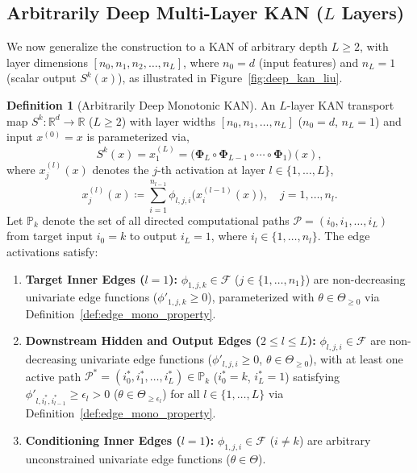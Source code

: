 \documentclass[11pt,a4paper]{article}
\theoremstyle{plain}
\theoremstyle{definition}
\newtheorem{definition}[theorem]{Definition}
\theoremstyle{remark}
\begin{document}
\subsection{Arbitrarily Deep Multi-Layer KAN (\texorpdfstring{$L$}{L} Layers)}

We now generalize the construction to a KAN of arbitrary depth $L \ge 2$, with layer dimensions $[n_0, n_1, n_2, \dots, n_L]$, where $n_0 = d$ (input features) and $n_L = 1$ (scalar output $S^k(x)$), as illustrated in Figure~\ref{fig:deep_kan_liu}.

\begin{definition}[Arbitrarily Deep Monotonic KAN]
\label{def:deep_mono_kan}
\label{def:deep_kan}
An $L$-layer KAN transport map $S^k: \mathbb{R}^d \to \mathbb{R}$ ($L \ge 2$) with layer widths $[n_0, n_1, \dots, n_L]$ ($n_0 = d$, $n_L = 1$) and input $x^{(0)} = x$ is parameterized via,
\begin{equation}
    S^k(x) = x^{(L)}_1 = \Big( \mathbf{\Phi}_L \circ \mathbf{\Phi}_{L-1} \circ \cdots \circ \mathbf{\Phi}_1 \Big)(x),
    \label{eq:kan_composition_def}
\end{equation}
where $x^{(l)}_j(x)$ denotes the $j$-th activation at layer $l \in \{1, \dots, L\}$,
\begin{equation}
    x^{(l)}_j(x) \coloneqq \sum_{i=1}^{n_{l-1}} \phi_{l, j, i}\big(x^{(l-1)}_i(x)\big), \quad j = 1, \dots, n_l.
    \label{eq:kan_layer_def}
\end{equation}
Let $\mathbb{P}_k$ denote the set of all directed computational paths $\mathcal{P} = (i_0, i_1, \dots, i_L)$ from target input $i_0 = k$ to output $i_L = 1$, where $i_l \in \{1, \dots, n_l\}$. The edge activations satisfy:
\begin{enumerate}
    \item \textbf{Target Inner Edges ($l=1$):} $\phi_{1, j, k} \in \mathcal{F}$ ($j \in \{1, \dots, n_1\}$) are non-decreasing univariate edge functions ($\phi'_{1, j, k} \ge 0$), parameterized with $\theta \in \Theta_{\ge 0}$ via Definition~\ref{def:edge_mono_property}.
    \item \textbf{Downstream Hidden and Output Edges ($2 \le l \le L$):} $\phi_{l, j, i} \in \mathcal{F}$ are non-decreasing univariate edge functions ($\phi'_{l, j, i} \ge 0$, $\theta \in \Theta_{\ge 0}$), with at least one active path $\mathcal{P}^* = (i_0^*, i_1^*, \dots, i_L^*) \in \mathbb{P}_k$ ($i_0^* = k$, $i_L^* = 1$) satisfying $\phi'_{l, i_l^*, i_{l-1}^*} \ge \epsilon_l > 0$ ($\theta \in \Theta_{\ge \epsilon_l}$) for all $l \in \{1, \dots, L\}$ via Definition~\ref{def:edge_mono_property}.
    \item \textbf{Conditioning Inner Edges ($l=1$):} $\phi_{1, j, i} \in \mathcal{F}$ ($i \neq k$) are arbitrary unconstrained univariate edge functions ($\theta \in \Theta$).
\end{enumerate}
\end{definition}
\end{document}
